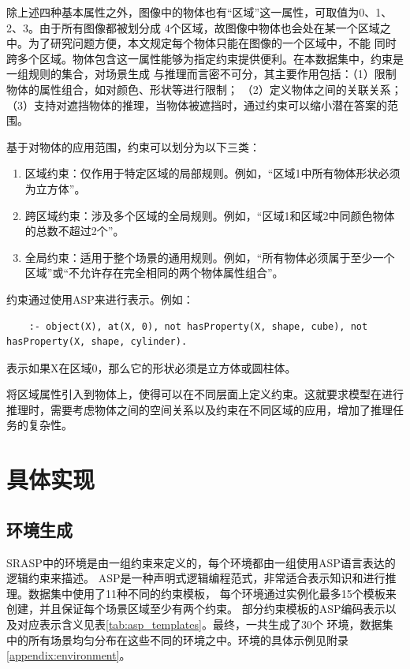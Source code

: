 除上述四种基本属性之外，图像中的物体也有“区域”这一属性，可取值为0、1、2、3。由于所有图像都被划分成
4个区域，故图像中物体也会处在某一个区域之中。为了研究问题方便，本文规定每个物体只能在图像的一个区域中，不能
同时跨多个区域。物体包含这一属性能够为指定约束提供便利。在本数据集中，约束是一组规则的集合，对场景生成
与推理而言密不可分，其主要作用包括：（1）限制物体的属性组合，如对颜色、形状等进行限制；
（2）定义物体之间的关联关系；（3）支持对遮挡物体的推理，当物体被遮挡时，通过约束可以缩小潜在答案的范围。

基于对物体的应用范围，约束可以划分为以下三类：
\begin{enumerate}[itemsep=0pt,parsep=0pt]
    \item 区域约束：仅作用于特定区域的局部规则。例如，“区域1中所有物体形状必须为立方体”。
    \item 跨区域约束：涉及多个区域的全局规则。例如，“区域1和区域2中同颜色物体的总数不超过2个”。
    \item 全局约束：适用于整个场景的通用规则。例如，“所有物体必须属于至少一个区域”或“不允许存在完全相同的两个物体属性组合”。
\end{enumerate}

约束通过使用ASP来进行表示。例如：
\begin{lstlisting}
    :- object(X), at(X, 0), not hasProperty(X, shape, cube), not hasProperty(X, shape, cylinder).
\end{lstlisting}
表示如果X在区域0，那么它的形状必须是立方体或圆柱体。

将区域属性引入到物体上，使得可以在不同层面上定义约束。这就要求模型在进行推理时，需要考虑物体之间的空间关系以及约束在不同区域的应用，增加了推理任务的复杂性。
\section{具体实现}

\subsection{环境生成}
SRASP中的环境是由一组约束来定义的，每个环境都由一组使用ASP语言表达的逻辑约束来描述。
ASP是一种声明式逻辑编程范式，非常适合表示知识和进行推理。数据集中使用了11种不同的约束模板，
每个环境通过实例化最多15个模板来创建，并且保证每个场景区域至少有两个约束。
部分约束模板的ASP编码表示以及对应表示含义见表\ref{tab:asp_templates}。最终，一共生成了30个
环境，数据集中的所有场景均匀分布在这些不同的环境之中。环境的具体示例见附录\ref{appendix:environment}。

